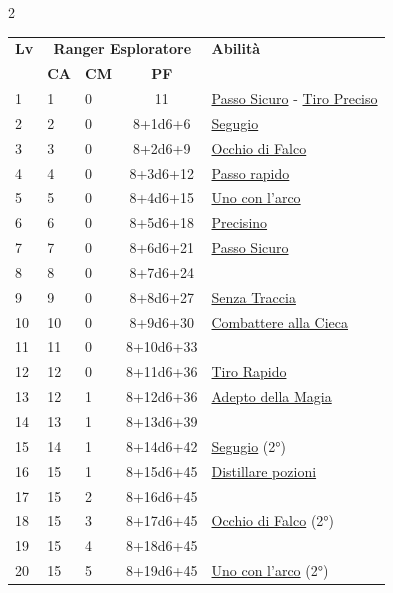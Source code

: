 {\begin{multicols}{2}

\noindent\begin{tabularx}{\linewidth}{p{0.55cm}|p{0.55cm}p{0.55cm}c|X|}
	\toprule
 \rowcolor{gray!20}	\textbf{Lv} & \multicolumn{3}{c|}{\textbf{Ranger Esploratore}} & \textbf{Abilità} \\
& \centering\arraybackslash \textbf{CA} & \centering\arraybackslash \textbf{CM} & \centering\arraybackslash \textbf{PF} & \\
	\toprule
	1 & 1 & 0 & 11 & \hyperlink{Passo Sicuro}{Passo Sicuro} - \hyperlink{Tiro Preciso}{Tiro Preciso}\\
	\rowcolor{gray!20}2 & 2 & 0 & 8+1d6+6 & \hyperlink{Segugio}{Segugio}\\
	3 & 3 & 0 & 8+2d6+9 & \hyperlink{Occhio di Falco}{Occhio di Falco}\\
	\rowcolor{gray!20}4 & 4 & 0 & 8+3d6+12 & \hyperlink{Passo rapido}{Passo rapido}\\
	5 & 5 & 0 & 8+4d6+15 & \hyperlink{Uno con l'arco}{Uno con l'arco}\\
	\rowcolor{gray!20}6 & 6 & 0 & 8+5d6+18 & \hyperlink{Precisino}{Precisino}\\
	7 & 7 & 0 & 8+6d6+21 & \hyperlink{Passo Sicuro}{Passo Sicuro}\\
	\rowcolor{gray!20}8 & 8 & 0 & 8+7d6+24 & \\
	9 & 9 & 0 & 8+8d6+27 & \hyperlink{Senza Traccia}{Senza Traccia}\\
	\rowcolor{gray!20}10 & 10 & 0 & 8+9d6+30 & \hyperlink{Combattere alla Cieca}{Combattere alla Cieca}\\
	11 & 11 & 0 & 8+10d6+33 & \\
	\rowcolor{gray!20}12 & 12 & 0 & 8+11d6+36 & \hyperlink{Tiro Rapido}{Tiro Rapido}\\
	13 & 12 & 1 & 8+12d6+36 & \hyperlink{Adepto della Magia}{Adepto della Magia}\\
	\rowcolor{gray!20}14 & 13 & 1 & 8+13d6+39 & \\
	15 & 14 & 1 & 8+14d6+42 & \hyperlink{Segugio}{Segugio} (2°)\\
	\rowcolor{gray!20}16 & 15 & 1 & 8+15d6+45 & \hyperlink{Distillare pozioni}{Distillare pozioni}\\
	17 & 15 & 2 & 8+16d6+45 & \\
	\rowcolor{gray!20}18 & 15 & 3 & 8+17d6+45 & \hyperlink{Occhio di Falco}{Occhio di Falco} (2°)\\
	19 & 15 & 4 & 8+18d6+45 & \\
	\rowcolor{gray!20}20 & 15 & 5 & 8+19d6+45 & \hyperlink{Uno con l'arco}{Uno con l'arco} (2°)\\
\end{tabularx}


\end{multicols}}
